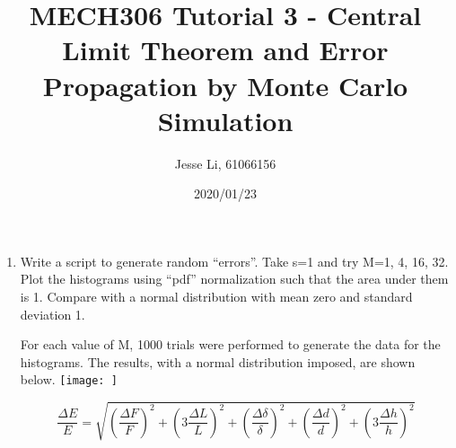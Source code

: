 \documentclass{article}
\begin{document}
\author{Jesse Li, 61066156}
\date{2020/01/23}
\title{MECH306 Tutorial 3 - Central Limit Theorem and Error Propagation by Monte Carlo Simulation}

\maketitle

\begin{enumerate}
    \item Write a script to generate random “errors”. Take s=1 and try M=1, 4, 16, 32. Plot the histograms using “pdf” normalization such that the area under them is 1. Compare with a normal distribution with mean zero and standard deviation 1.

For each value of M, 1000 trials were performed to generate the data for the histograms. The results, with a normal distribution imposed, are shown below.
\texttt{[image: ]}

\newcommand{\reluncer}[2][]{\left( #1 \frac{\Delta #2}{#2} \right)^2 }

\[
\frac{\Delta E}{E} = \sqrt{\reluncer{F} + \reluncer[3]{L} + \reluncer{\delta} + \reluncer{d} + \reluncer[3]{h}}
\]



\end{enumerate}
\end{document}
